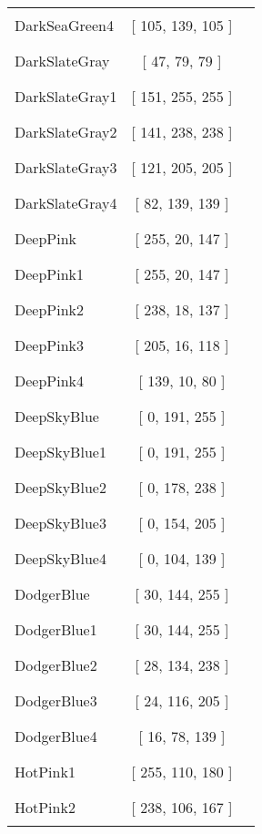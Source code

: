 \begin{tabular}{|l|c|c|}
DarkSeaGreen4 & [ 105, 139, 105 ] & \color{DarkSeaGreen4} \rule{1cm}{1.5ex}\\
DarkSlateGray & [ 47, 79, 79 ] & \color{DarkSlateGray} \rule{1cm}{1.5ex}\\
DarkSlateGray1 & [ 151, 255, 255 ] & \color{DarkSlateGray1} \rule{1cm}{1.5ex}\\
DarkSlateGray2 & [ 141, 238, 238 ] & \color{DarkSlateGray2} \rule{1cm}{1.5ex}\\
DarkSlateGray3 & [ 121, 205, 205 ] & \color{DarkSlateGray3} \rule{1cm}{1.5ex}\\
DarkSlateGray4 & [ 82, 139, 139 ] & \color{DarkSlateGray4} \rule{1cm}{1.5ex}\\
DeepPink & [ 255, 20, 147 ] & \color{DeepPink} \rule{1cm}{1.5ex}\\
DeepPink1 & [ 255, 20, 147 ] & \color{DeepPink1} \rule{1cm}{1.5ex}\\
DeepPink2 & [ 238, 18, 137 ] & \color{DeepPink2} \rule{1cm}{1.5ex}\\
DeepPink3 & [ 205, 16, 118 ] & \color{DeepPink3} \rule{1cm}{1.5ex}\\
DeepPink4 & [ 139, 10, 80 ] & \color{DeepPink4} \rule{1cm}{1.5ex}\\
DeepSkyBlue & [ 0, 191, 255 ] & \color{DeepSkyBlue} \rule{1cm}{1.5ex}\\
DeepSkyBlue1 & [ 0, 191, 255 ] & \color{DeepSkyBlue1} \rule{1cm}{1.5ex}\\
DeepSkyBlue2 & [ 0, 178, 238 ] & \color{DeepSkyBlue2} \rule{1cm}{1.5ex}\\
DeepSkyBlue3 & [ 0, 154, 205 ] & \color{DeepSkyBlue3} \rule{1cm}{1.5ex}\\
DeepSkyBlue4 & [ 0, 104, 139 ] & \color{DeepSkyBlue4} \rule{1cm}{1.5ex}\\
DodgerBlue & [ 30, 144, 255 ] & \color{DodgerBlue} \rule{1cm}{1.5ex}\\
DodgerBlue1 & [ 30, 144, 255 ] & \color{DodgerBlue1} \rule{1cm}{1.5ex}\\
DodgerBlue2 & [ 28, 134, 238 ] & \color{DodgerBlue2} \rule{1cm}{1.5ex}\\
DodgerBlue3 & [ 24, 116, 205 ] & \color{DodgerBlue3} \rule{1cm}{1.5ex}\\
DodgerBlue4 & [ 16, 78, 139 ] & \color{DodgerBlue4} \rule{1cm}{1.5ex}\\
HotPink1 & [ 255, 110, 180 ] & \color{HotPink1} \rule{1cm}{1.5ex}\\
HotPink2 & [ 238, 106, 167 ] & \color{HotPink2} \rule{1cm}{1.5ex}\\

\end{tabular}
